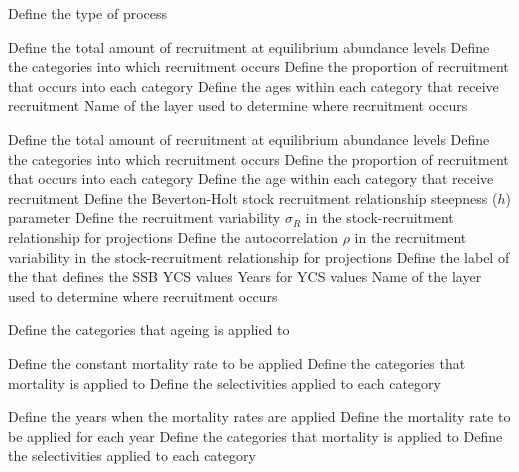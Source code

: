  {Define the type of process}
\par\textbf{}\par
{} {Define the total amount of recruitment at equilibrium abundance levels}
 {Define the categories into which recruitment occurs}
 {Define the proportion of recruitment that occurs into each category}
 {Define the ages within each category that receive recruitment}
 {Name of the layer used to determine where recruitment occurs}
\par\textbf{}\par
{} {Define the total amount of recruitment at equilibrium abundance levels}
 {Define the categories into which recruitment occurs}
 {Define the proportion of recruitment that occurs into each category}
 {Define the age within each category that receive recruitment}
 {Define the Beverton-Holt stock recruitment relationship steepness ($h$) parameter}
 {Define the recruitment variability $\sigma_R$ in the stock-recruitment relationship for projections}
 {Define the autocorrelation $\rho$ in the recruitment variability in the stock-recruitment relationship for projections}
 {Define the label of the  that defines the SSB}
 {YCS values}
 {Years for YCS values}
 {Name of the layer used to determine where recruitment occurs}
\par\textbf{}\par
{} {Define the categories that ageing is applied to}
\par\textbf{}\par
{} {Define the constant mortality rate to be applied}
 {Define the categories that mortality is applied to}
 {Define the selectivities applied to each category}
\par\textbf{}\par
{} {Define the years when the mortality rates are applied}
 {Define the mortality rate to be applied for each year}
 {Define the categories that mortality is applied to}
 {Define the selectivities applied to each category}

